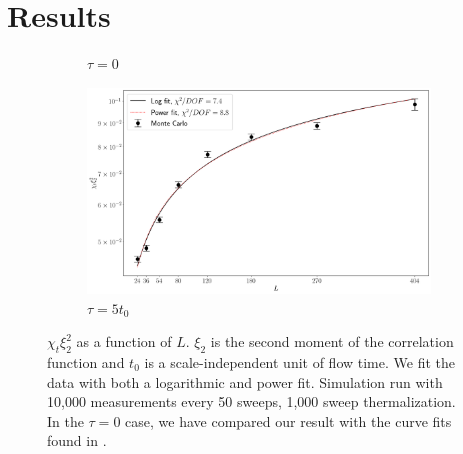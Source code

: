 \documentclass[a4paper,11pt]{article}
\begin{document}
\section{Results}
\begin{figure}[h!]
    \begin{center}
        \begin{subfigure}[b]{0.45\textwidth}
            \caption{$\tau = 0$}
        \end{subfigure}%
        \begin{subfigure}[b]{0.45\textwidth}
            \centering
            \includegraphics[height=0.7\textwidth]{divergence_flowed.png}
            \caption{$\tau = 5t_0$}
        \end{subfigure}
    \end{center}
        \caption{\label{fig:divergence} $\chi_t\xi_2^2$ as a function of $L$. $\xi_2$ is the second moment of the correlation function and $t_0$ is a scale-independent unit of flow time. We fit the data with both a logarithmic and power fit. Simulation run with 10,000 measurements every 50 sweeps, 1,000 sweep thermalization. In the $\tau=0$ case, we have compared our result with the curve fits found in \cite{bietenholz2018}.}
\end{figure}
\end{document}
